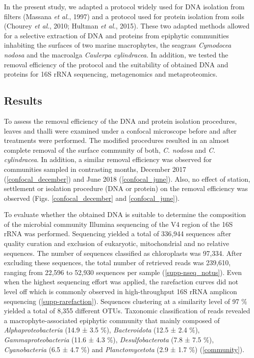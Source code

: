 \documentclass[12pt,]{article}
\begin{document}
In the present study, we adapted a protocol widely used for DNA
isolation from filters (Massana \emph{et al.}, 1997) and a protocol used
for protein isolation from soils (Chourey \emph{et al.}, 2010; Hultman
\emph{et al.}, 2015). These two adapted methods allowed for a selective
extraction of DNA and proteins from epiphytic communities inhabiting the
surfaces of two marine macrophytes, the seagrass \emph{Cymodocea nodosa}
and the macroalga \emph{Caulerpa cylindracea}. In addition, we tested
the removal efficiency of the protocol and the suitability of obtained
DNA and proteins for 16S rRNA sequencing, metagenomics and
metaproteomics.

\newpage

\hypertarget{results}{%
\subsection{Results}\label{results}}

To assess the removal efficiency of the DNA and protein isolation
procedures, leaves and thalli were examined under a confocal microscope
before and after treatments were performed. The modified procedures
resulted in an almost complete removal of the surface community of both,
\emph{C. nodosa} and \emph{C. cylindracea}. In addition, a similar
removal efficiency was observed for communities sampled in contrasting
months, December 2017 (\autoref{confocal_december}) and June 2018
(\autoref{confocal_june}). Also, no effect of station, settlement or
isolation procedure (DNA or protein) on the removal efficiency was
observed (Figs. \ref{confocal_december} and \ref{confocal_june}).

To evaluate whether the obtained DNA is suitable to determine the
composition of the microbial community Illumina sequencing of the V4
region of the 16S rRNA was performed. Sequencing yielded a total of
336,944 sequences after quality curation and exclusion of eukaryotic,
mitochondrial and no relative sequences. The number of sequences
classified as chloroplasts was 97,334. After excluding these sequences,
the total number of retrieved reads was 239,610, ranging from 22,596 to
52,930 sequences per sample (\autoref{supp-nseq_notus}). Even when the
highest sequencing effort was applied, the rarefaction curves did not
level off which is commonly observed in high-throughput 16S rRNA
amplicon sequencing (\autoref{supp-rarefaction}). Sequences clustering
at a similarity level of 97 \si{\percent} yielded a total of 8,355
different OTUs. Taxonomic classification of reads revealed a
macrophyte-associated epiphytic community that mainly composed of
\emph{Alphaproteobacteria} (14.9 ± 3.5 \si{\percent}),
\emph{Bacteroidota} (12.5 ± 2.4 \si{\percent}),
\emph{Gammaproteobacteria} (11.6 ± 4.3 \si{\percent}),
\emph{Desulfobacterota} (7.8 ± 7.5 \si{\percent}), \emph{Cyanobacteria}
(6.5 ± 4.7 \si{\percent}) and \emph{Planctomycetota} (2.9 ± 1.7
\si{\percent}) (\autoref{community}).
\end{document}
